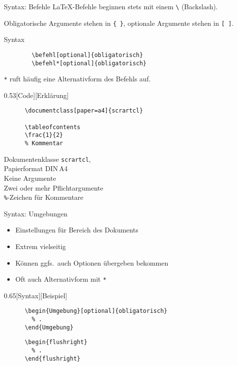 \begin{frame}[fragile]{Syntax: Befehle}
  \LaTeX-Befehle beginnen stets mit einem \verb+\+ (Backslash).

  Obligatorische Argumente stehen in \lstinline+{ }+, optionale Argumente stehen in \lstinline+[ ]+.
    \begin{block}{Syntax}
      \begin{lstlisting}
        \befehl[optional]{obligatorisch}
        \befehl*[optional]{obligatorisch}
      \end{lstlisting}
    \end{block}

  \verb+*+ ruft häufig eine Alternativform des Befehls auf.
  \begin{CodeExplanation}{0.53}[Code][Erklärung]
    \begin{lstlisting}
      \documentclass[paper=a4]{scrartcl}

      \tableofcontents
      \frac{1}{2}
      % Kommentar
    \end{lstlisting}
  \Explanation
    \strut
    Dokumentenklasse \texttt{scrartcl},\\
    Papierformat DIN\,A4 \\
    Keine Argumente \\
    Zwei oder mehr Pflichtargumente\\
    \verb+%+-Zeichen für Kommentare
  \end{CodeExplanation}
\end{frame}

\begin{frame}[fragile]{Syntax: Umgebungen}
  \begin{itemize}
    \item Einstellungen für Bereich des Dokuments
    \item Extrem vielseitig
    \item Können ggfs.\ auch Optionen übergeben bekommen
    \item Oft auch Alternativform mit \lstinline+*+
  \end{itemize}
  \begin{CodeExplanation}{0.65}[Syntax][Beispiel]
    \begin{lstlisting}
      \begin{Umgebung}[optional]{obligatorisch}
        % .
      \end{Umgebung}
    \end{lstlisting}
    \Explanation
    \begin{lstlisting}
      \begin{flushright}
        % .
      \end{flushright}
    \end{lstlisting}
  \end{CodeExplanation}
\end{frame}

